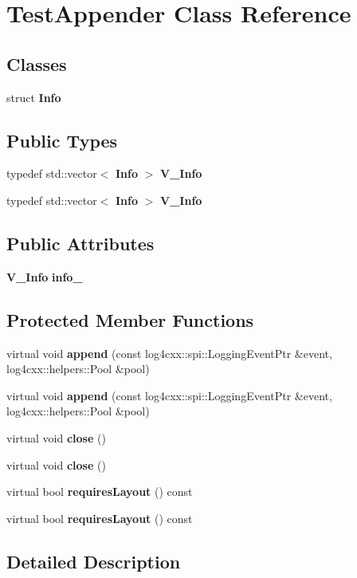 \section{TestAppender Class Reference}
\label{classTestAppender}
\subsection*{Classes}
\begin{DoxyCompactItemize}
\item 
struct {\bf Info}
\end{DoxyCompactItemize}
\subsection*{Public Types}
\begin{DoxyCompactItemize}
\item 
typedef std::vector$<$ {\bf Info} $>$ {\bf V\_\-Info}
\item 
typedef std::vector$<$ {\bf Info} $>$ {\bf V\_\-Info}
\end{DoxyCompactItemize}
\subsection*{Public Attributes}
\begin{DoxyCompactItemize}
\item 
{\bf V\_\-Info} {\bf info\_\-}
\end{DoxyCompactItemize}
\subsection*{Protected Member Functions}
\begin{DoxyCompactItemize}
\item 
virtual void {\bf append} (const log4cxx::spi::LoggingEventPtr \&event, log4cxx::helpers::Pool \&pool)
\item 
virtual void {\bf append} (const log4cxx::spi::LoggingEventPtr \&event, log4cxx::helpers::Pool \&pool)
\item 
virtual void {\bf close} ()
\item 
virtual void {\bf close} ()
\item 
virtual bool {\bf requiresLayout} () const 
\item 
virtual bool {\bf requiresLayout} () const 
\end{DoxyCompactItemize}


\subsection{Detailed Description}


